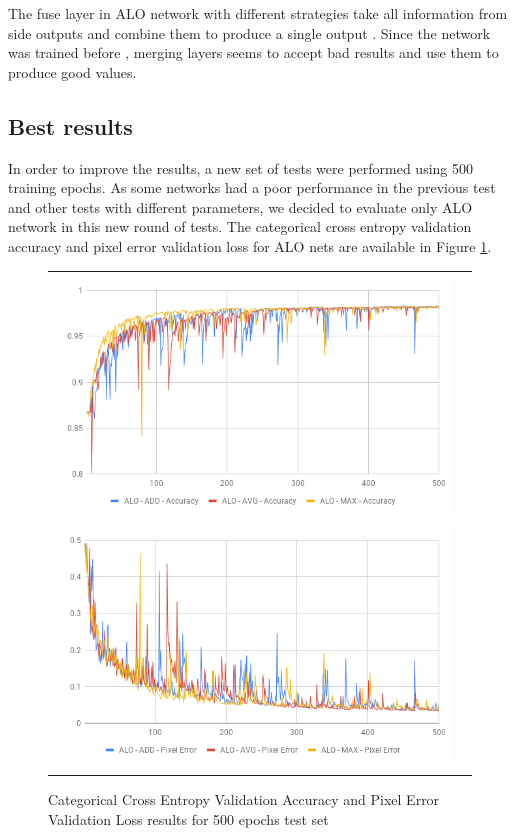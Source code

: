 The fuse layer in ALO network with different strategies take all information from side outputs and combine them to produce a single output . Since the network was trained before , merging layers  seems to accept bad results and use them to produce good values.

\subsection{Best results}

In order to improve the results, a new set of tests were performed using 500 training epochs. As some networks had a poor performance in the previous test and other tests with different parameters, we decided to evaluate only ALO network in this new round of tests. The categorical cross entropy validation accuracy and pixel error validation loss for ALO nets are available in Figure \ref{fig:val_acc_500_epochs}.

\begin{figure}
  \caption{Categorical Cross Entropy Validation Accuracy and Pixel Error Validation Loss results for 500 epochs test set}
  \centering
  \begin{tabular}{ll}
    \includegraphics[width=1.\columnwidth]{figures/falreis/val_acc_500_epochs.png}
  
    \includegraphics[width=1.\columnwidth]{figures/falreis/pixel_error_500_epochs.png}
  \end{tabular}%
  \label{fig:val_acc_500_epochs}
\end{figure}

